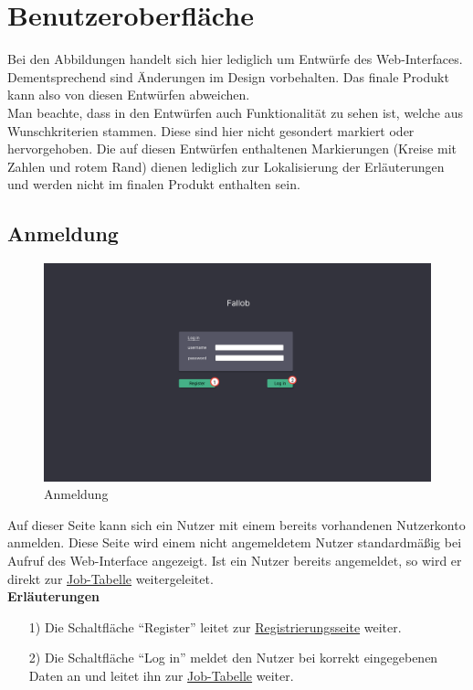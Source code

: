 \section{Benutzeroberfläche}

Bei den Abbildungen handelt sich hier lediglich um Entwürfe des Web-Interfaces. Dementsprechend sind Änderungen im Design vorbehalten. Das finale Produkt kann also von diesen Entwürfen abweichen.\\
Man beachte, dass in den Entwürfen auch Funktionalität zu sehen ist, welche aus Wunschkriterien stammen. Diese sind hier nicht gesondert markiert oder hervorgehoben. Die auf diesen Entwürfen enthaltenen Markierungen (Kreise mit Zahlen und rotem Rand) dienen lediglich zur Lokalisierung der Erläuterungen und werden nicht im finalen Produkt enthalten sein.
\subsection{Anmeldung}
\label{pages:login}
\begin{figure}[H]
    \centering
    \includegraphics[width=\textwidth]{images-interface/v4_interface/login_page_4.pdf}
    \caption{Anmeldung}
    \label{fig:login}
\end{figure}
Auf dieser Seite kann sich ein \gls{Nutzer} mit einem bereits vorhandenen \gls{Nutzerkonto} anmelden. Diese Seite wird einem nicht angemeldetem \gls{Nutzer} standardmäßig bei Aufruf des \gls{Web-Interface} angezeigt. Ist ein \gls{Nutzer} bereits angemeldet, so wird er direkt zur \hyperref[pages:job-table]{Job-Tabelle} weitergeleitet.\\
\newpage
\textbf{Erläuterungen}
\begin{itemize}
    \item[1)] Die Schaltfläche \enquote{Register} leitet zur \hyperref[pages:register]{Registrierungsseite} weiter.
    \item[2)] Die Schaltfläche \enquote{Log in} meldet den \gls{Nutzer} bei korrekt eingegebenen Daten an und leitet ihn zur \hyperref[pages:job-table]{Job-Tabelle} weiter.
\end{itemize}

